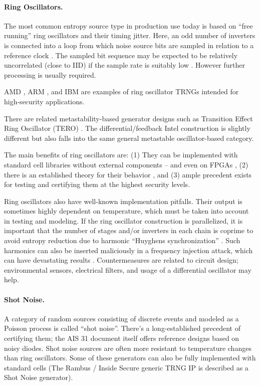     \paragraph{Ring Oscillators.}
    The most common entropy source type in production use today is
    based on ``free running'' ring oscillators and their timing jitter.
    Here, an odd number of inverters is connected into a loop from which
    noise source bits are sampled in relation to a reference clock
    \cite{BaLuMi+11}. The sampled bit sequence may be expected to be
    relatively uncorrelated (close to IID) if the sample rate is suitably low
    \cite{KiSc11}. However further processing is usually required.

    AMD \cite{AM17}, ARM \cite{AR17}, and IBM \cite{LiBaBo+13} are
    examples of ring oscillator TRNGs intended for high-security
    applications.

    There are related metastability-based generator designs such as
    Transition Effect Ring Oscillator (TERO) \cite{VaDr10}.
    The differential/feedback Intel construction \cite{HaKoMa12} is slightly
    different but also falls into the same general metastable
    oscillator-based category.

    The main benefits of ring oscillators are: (1) They can be implemented
    with standard cell libraries without external components --
    and even on FPGAs \cite{VaFiAu+10}, (2) there is an established theory
    for their behavior \cite{HaLe98,HaLiLe99,BaLuMi+11}, and (3) ample
    precedent exists for testing and certifying them at the highest security
    levels.

    Ring oscillators also have well-known implementation pitfalls.
    Their output is sometimes highly dependent on temperature,
    which must be taken into account in testing and modeling.
    If the ring oscillator construction is parallelized, it is important
    that the number of stages and/or inverters in each chain is coprime to
    avoid entropy reduction due to harmonic ``Huyghens synchronization''
    \cite{Ba86}.
    Such harmonics can also be inserted maliciously in a frequency
    injection attack, which can have devastating results \cite{MaMo09}.
    Countermeasures are related to circuit design; environmental sensors,
    electrical filters, and usage of a differential oscillator may help.

    \paragraph{Shot Noise.}
    A category of random sources consisting of discrete events
    and modeled as a Poisson process is called ``shot noise''.
    There's a long-established precedent of certifying them; the
    AIS 31 document \cite{KiSc11} itself offers reference designs based on
    noisy diodes. Shot noise sources are often more resistant to
    temperature changes than ring oscillators.
    Some of these generators can also be fully implemented with standard
    cells (The Rambus / Inside Secure generic TRNG IP \cite{Ra20} is described
    as a Shot Noise generator).

